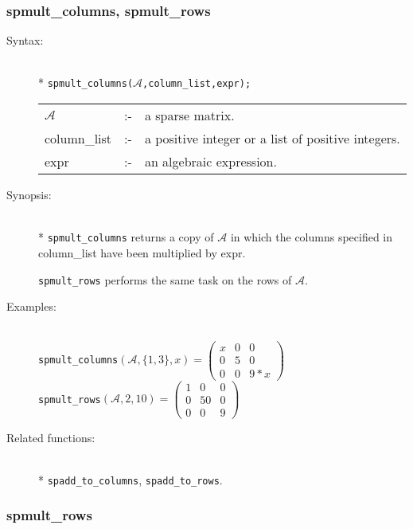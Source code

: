 \subsubsection{spmult\_columns, spmult\_rows}
\label{sparse:spmult_columns}
\hypertarget{operator:SPMULT_COLUMNS}{}

\begin{description}
\item[Syntax:]\mbox{}\\*
\texttt{spmult\_columns($\mathcal{A}$,column\_list,expr);}\\[2mm]
\begin{tabular}{l l l}
$\mathcal{A}$   &:-& a sparse matrix. \\
column\_list &:-& a positive integer or a list of positive integers. \\
expr        &:-& an algebraic expression.
\end{tabular}

\item[Synopsis:]\mbox{}\\*
\texttt{spmult\_columns} returns a copy of $\mathcal{A}$ in which
                the columns specified in column\_list have been
multiplied by expr.

\texttt{spmult\_rows} performs the same task on the rows of $\mathcal{A}$.

\item[Examples:]\mbox{}\\
\texttt{spmult\_columns}\((\mathcal{A},\{1,3\},x) =
        \begin{pmatrix} x & 0 & 0 \\ 0 & 5 & 0 \\ 0 & 0 & 9*x \end{pmatrix}\) \\[2mm]
\texttt{spmult\_rows}\((\mathcal{A},2,10)  =
        \begin{pmatrix} 1 & 0 & 0 \\ 0 & 50 & 0 \\ 0 & 0 & 9 \end{pmatrix}\)

\item[Related functions:]\mbox{}\\*
\texttt{spadd\_to\_columns}, \texttt{spadd\_to\_rows}.
\end{description}

\subsubsection{spmult\_rows}
\label{sparse:spmult_rows}
\hypertarget{operator:SPMULT_ROWS}{}

